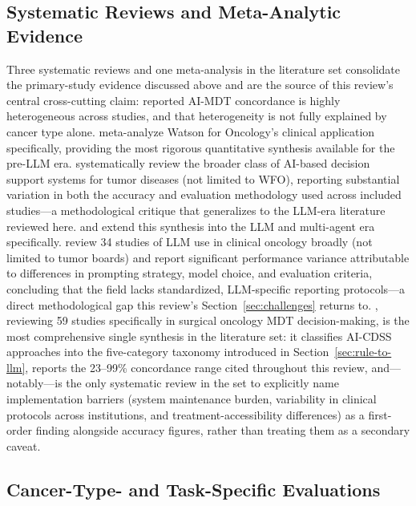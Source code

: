 \documentclass{article}
\begin{document}
\subsection{Systematic Reviews and Meta-Analytic Evidence}
\label{sec:systematic}

Three systematic reviews and one meta-analysis in the literature set consolidate the primary-study evidence discussed above and are the source of this review's central cross-cutting claim: reported AI-MDT concordance is highly heterogeneous across studies, and that heterogeneity is not fully explained by cancer type alone. \citet{jie2021} meta-analyze Watson for Oncology's clinical application specifically, providing the most rigorous quantitative synthesis available for the pre-LLM era. \citet{oehring2023} systematically review the broader class of AI-based decision support systems for tumor diseases (not limited to WFO), reporting substantial variation in both the accuracy and evaluation methodology used across included studies---a methodological critique that generalizes to the LLM-era literature reviewed here. \citet{carl2024} and \citet{wu2026} extend this synthesis into the LLM and multi-agent era specifically. \citet{carl2024} review 34 studies of LLM use in clinical oncology broadly (not limited to tumor boards) and report significant performance variance attributable to differences in prompting strategy, model choice, and evaluation criteria, concluding that the field lacks standardized, LLM-specific reporting protocols---a direct methodological gap this review's Section~\ref{sec:challenges} returns to. \citet{wu2026}, reviewing 59 studies specifically in surgical oncology MDT decision-making, is the most comprehensive single synthesis in the literature set: it classifies AI-CDSS approaches into the five-category taxonomy introduced in Section~\ref{sec:rule-to-llm}, reports the 23--99\% concordance range cited throughout this review, and---notably---is the only systematic review in the set to explicitly name implementation barriers (system maintenance burden, variability in clinical protocols across institutions, and treatment-accessibility differences) as a first-order finding alongside accuracy figures, rather than treating them as a secondary caveat.

\subsection{Cancer-Type- and Task-Specific Evaluations}
\label{sec:cancer-specific}
\end{document}
